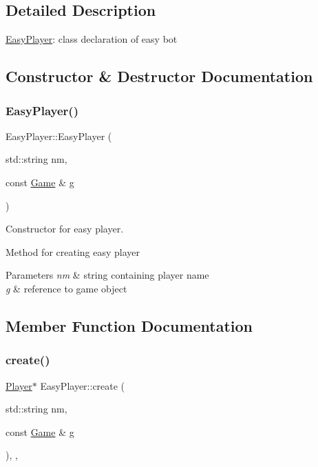 \subsection{Detailed Description}
\mbox{\hyperlink{class_easy_player}{Easy\+Player}}\+: class declaration of easy bot 

\subsection{Constructor \& Destructor Documentation}
\mbox{\label{class_easy_player_abf0692676d0bf3c0eb6f6741c621c7ec}} 
\subsubsection{\texorpdfstring{Easy\+Player()}{EasyPlayer()}}
{\footnotesize\ttfamily Easy\+Player\+::\+Easy\+Player (\begin{DoxyParamCaption}\item[{std\+::string}]{nm,  }\item[{const \mbox{\hyperlink{class_game}{Game}} \&}]{g }\end{DoxyParamCaption})}



Constructor for easy player. 

Method for creating easy player 
\begin{DoxyParams}{Parameters}
{\em nm} & string containing player name \\
\hline
{\em g} & reference to game object \\
\hline
\end{DoxyParams}


\subsection{Member Function Documentation}
\mbox{\label{class_easy_player_a5c9837adc8dd76f5bb9e3ee7a576658f}} 
\subsubsection{\texorpdfstring{create()}{create()}}
{\footnotesize\ttfamily \mbox{\hyperlink{class_player}{Player}}$\ast$ Easy\+Player\+::create (\begin{DoxyParamCaption}\item[{std\+::string}]{nm,  }\item[{const \mbox{\hyperlink{class_game}{Game}} \&}]{g }\end{DoxyParamCaption})\hspace{0.3cm}{\ttfamily [inline]}, {\ttfamily [override]}, {\ttfamily [virtual]}}

